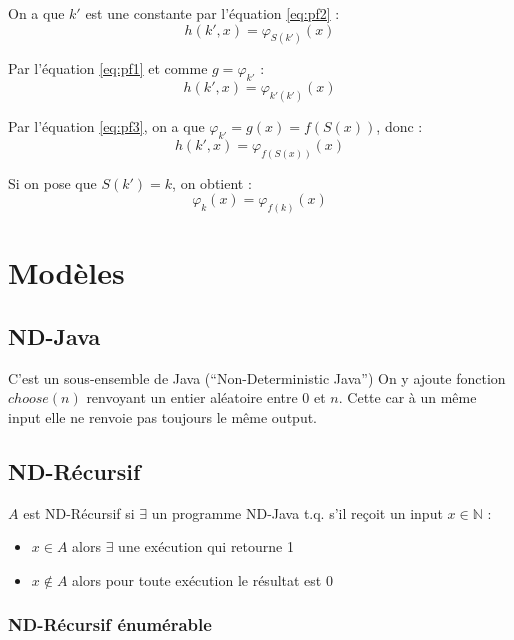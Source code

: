 On a que $k'$ est une constante par l'équation \ref{eq:pf2} :
\begin{equation*}
h(k',x) = \varphi_{S(k')}(x)
\end{equation*}

Par l'équation \ref{eq:pf1} et comme $g = \varphi_{k'}$ :
\begin{equation*}
h(k',x) = \varphi_{k'(k')}(x)
\end{equation*}

Par l'équation \ref{eq:pf3}, on a que $\varphi_{k'} = g(x) = f(S(x))$, donc :
\begin{equation*}
h(k',x) = \varphi_{f(S(x))}(x)
\end{equation*}

Si on pose que $S(k') = k$, on obtient :
\begin{equation*}
\varphi_k(x) = \varphi_{f(k)}(x)
\end{equation*}

\chapter{Modèles}

\section{ND-Java}

C’est un sous-ensemble de Java (“Non-Deterministic Java”)
On y ajoute fonction $choose(n)$ renvoyant un entier aléatoire entre 0 et $n$. Cette  car à un même input elle ne renvoie pas toujours le même output.

\section{ND-Récursif}

$A$ est ND-Récursif si $\exists$ un programme ND-Java t.q. s'il reçoit un input $x \in \mathbb{N}$ :
\begin{itemize}
\item $x \in A$ alors $\exists$ une exécution qui retourne 1
\item $x \notin A$ alors pour toute exécution le résultat est 0
\end{itemize}

\subsection{ND-Récursif énumérable}

